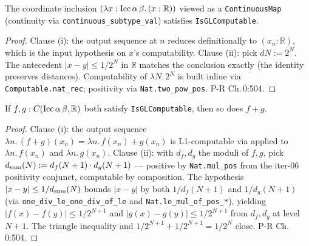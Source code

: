 \begin{lemma}
  \label{lem:l2_id_gl}
  \leanok
  The coordinate inclusion $(\lambda x : \textnormal{Icc}\,\alpha\,\beta.\,(x : \mathbb{R}))$ viewed as a \texttt{ContinuousMap} (continuity via \texttt{continuous\_subtype\_val}) satisfies \texttt{IsGLComputable}.
\end{lemma}
\begin{proof}\leanok
  Clause (i): the output sequence at $n$ reduces definitionally to $(x_n : \mathbb{R})$, which is the input hypothesis on $x$'s computability. Clause (ii): pick $d N := 2^N$. The antecedent $|x - y| \le 1/2^N$ in $\mathbb{R}$ matches the conclusion exactly (the identity preserves distances). Computability of $\lambda N.\,2^N$ is built inline via \texttt{Computable.nat\_rec}; positivity via \texttt{Nat.two\_pow\_pos}. P-R Ch.\,0:504.
\end{proof}

\begin{lemma}
  \label{lem:l2_sum_gl}
  \leanok
  If $f, g : C(\textnormal{Icc}\,\alpha\,\beta, \mathbb{R})$ both satisfy \texttt{IsGLComputable}, then so does $f + g$.
\end{lemma}
\begin{proof}\leanok
  Clause (i): the output sequence $\lambda n.\,(f+g)(x_n) = \lambda n.\,f(x_n) + g(x_n)$ is L1-computable via  applied to $\lambda n.\,f(x_n)$ and $\lambda n.\,g(x_n)$. Clause (ii): with $d_f, d_g$ the moduli of $f, g$, pick $d_{\textnormal{sum}}(N) := d_f(N+1) \cdot d_g(N+1)$ — positive by \texttt{Nat.mul\_pos} from the iter-06 positivity conjunct, computable by composition. The hypothesis $|x-y| \le 1/d_{\textnormal{sum}}(N)$ bounds $|x-y|$ by both $1/d_f(N+1)$ and $1/d_g(N+1)$ (via \texttt{one\_div\_le\_one\_div\_of\_le} and \texttt{Nat.le\_mul\_of\_pos\_*}), yielding $|f(x) - f(y)| \le 1/2^{N+1}$ and $|g(x) - g(y)| \le 1/2^{N+1}$ from $d_f, d_g$ at level $N+1$. The triangle inequality and $1/2^{N+1} + 1/2^{N+1} = 1/2^N$ close. P-R Ch.\,0:504.
\end{proof}

